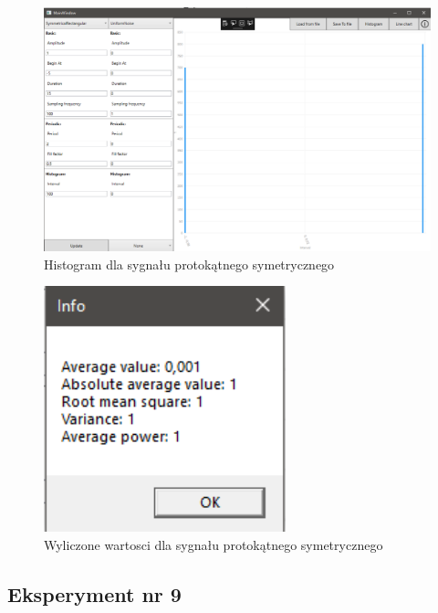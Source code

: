 \documentclass[12pt]{article}
\begin{document}
\begin{figure}[H]
 \centering
 \includegraphics[width=14cm]{images/symrect1hist.PNG}
 \vspace{-0.3cm}
 \caption{Histogram dla sygnału protokątnego symetrycznego}
 \label{gui}
\end{figure}

\begin{figure}[H]
 \centering
 \includegraphics[width=7cm]{images/symrect1info.PNG}
 \vspace{-0.3cm}
 \caption{Wyliczone wartosci dla sygnału protokątnego symetrycznego}
 \label{gui}
\end{figure}



\subsection{Eksperyment nr 9 }
\end{document}
